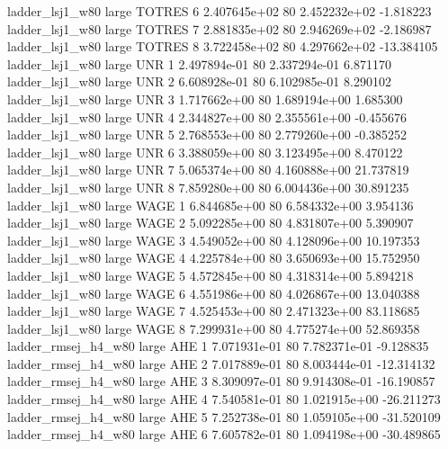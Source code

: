     ladder_lsj1_w80      large   TOTRES                 6 2.407645e+02 80   2.452232e+02          -1.818223
    ladder_lsj1_w80      large   TOTRES                 7 2.881835e+02 80   2.946269e+02          -2.186987
    ladder_lsj1_w80      large   TOTRES                 8 3.722458e+02 80   4.297662e+02         -13.384105
    ladder_lsj1_w80      large      UNR                 1 2.497894e-01 80   2.337294e-01           6.871170
    ladder_lsj1_w80      large      UNR                 2 6.608928e-01 80   6.102985e-01           8.290102
    ladder_lsj1_w80      large      UNR                 3 1.717662e+00 80   1.689194e+00           1.685300
    ladder_lsj1_w80      large      UNR                 4 2.344827e+00 80   2.355561e+00          -0.455676
    ladder_lsj1_w80      large      UNR                 5 2.768553e+00 80   2.779260e+00          -0.385252
    ladder_lsj1_w80      large      UNR                 6 3.388059e+00 80   3.123495e+00           8.470122
    ladder_lsj1_w80      large      UNR                 7 5.065374e+00 80   4.160888e+00          21.737819
    ladder_lsj1_w80      large      UNR                 8 7.859280e+00 80   6.004436e+00          30.891235
    ladder_lsj1_w80      large     WAGE                 1 6.844685e+00 80   6.584332e+00           3.954136
    ladder_lsj1_w80      large     WAGE                 2 5.092285e+00 80   4.831807e+00           5.390907
    ladder_lsj1_w80      large     WAGE                 3 4.549052e+00 80   4.128096e+00          10.197353
    ladder_lsj1_w80      large     WAGE                 4 4.225784e+00 80   3.650693e+00          15.752950
    ladder_lsj1_w80      large     WAGE                 5 4.572845e+00 80   4.318314e+00           5.894218
    ladder_lsj1_w80      large     WAGE                 6 4.551986e+00 80   4.026867e+00          13.040388
    ladder_lsj1_w80      large     WAGE                 7 4.525453e+00 80   2.471323e+00          83.118685
    ladder_lsj1_w80      large     WAGE                 8 7.299931e+00 80   4.775274e+00          52.869358
ladder_rmsej_h4_w80      large      AHE                 1 7.071931e-01 80   7.782371e-01          -9.128835
ladder_rmsej_h4_w80      large      AHE                 2 7.017889e-01 80   8.003444e-01         -12.314132
ladder_rmsej_h4_w80      large      AHE                 3 8.309097e-01 80   9.914308e-01         -16.190857
ladder_rmsej_h4_w80      large      AHE                 4 7.540581e-01 80   1.021915e+00         -26.211273
ladder_rmsej_h4_w80      large      AHE                 5 7.252738e-01 80   1.059105e+00         -31.520109
ladder_rmsej_h4_w80      large      AHE                 6 7.605782e-01 80   1.094198e+00         -30.489865
